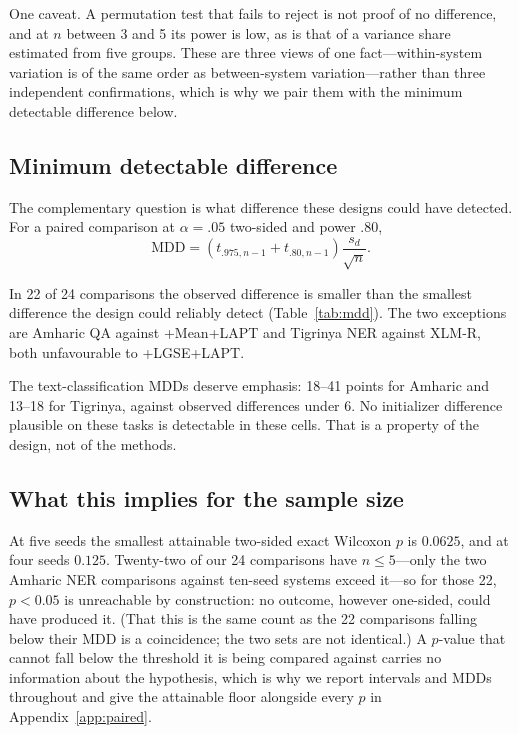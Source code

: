 \documentclass[11pt]{article}
\begin{document}
One caveat. A permutation test that fails to reject is not proof of no
difference, and at $n$ between 3 and 5 its power is low, as is that of a
variance share estimated from five groups. These are three views of one
fact---within-system variation is of the same order as between-system
variation---rather than three independent confirmations, which is why we pair
them with the minimum detectable difference below.

\subsection{Minimum detectable difference}

The complementary question is what difference these designs could have
detected. For a paired comparison at $\alpha = .05$ two-sided and power
$.80$,
\begin{equation}
\text{MDD} = \left(t_{.975,n-1} + t_{.80,n-1}\right)\frac{s_d}{\sqrt{n}} .
\end{equation}



In 22 of 24 comparisons the observed difference is smaller than the smallest
difference the design could reliably detect (Table~\ref{tab:mdd}). The two
exceptions are Amharic QA against +Mean+LAPT and Tigrinya NER against XLM-R,
both unfavourable to +LGSE+LAPT.

The text-classification MDDs deserve emphasis: 18--41 points for Amharic and
13--18 for Tigrinya, against observed differences under 6. No initializer
difference plausible on these tasks is detectable in these cells. That is a
property of the design, not of the methods.

\subsection{What this implies for the sample size}

At five seeds the smallest attainable two-sided exact Wilcoxon $p$ is
$0.0625$, and at four seeds $0.125$. Twenty-two of our 24 comparisons have
$n \leq 5$---only the two Amharic NER comparisons against ten-seed systems
exceed it---so for those 22, $p < 0.05$ is unreachable by construction: no
outcome, however one-sided, could have produced it. (That this is the same
count as the 22 comparisons falling below their MDD is a coincidence; the two
sets are not identical.) A
$p$-value that cannot fall below the threshold it is being compared against
carries no information about the hypothesis, which is why we report intervals
and MDDs throughout and give the attainable floor alongside every $p$ in
Appendix~\ref{app:paired}.
\end{document}
